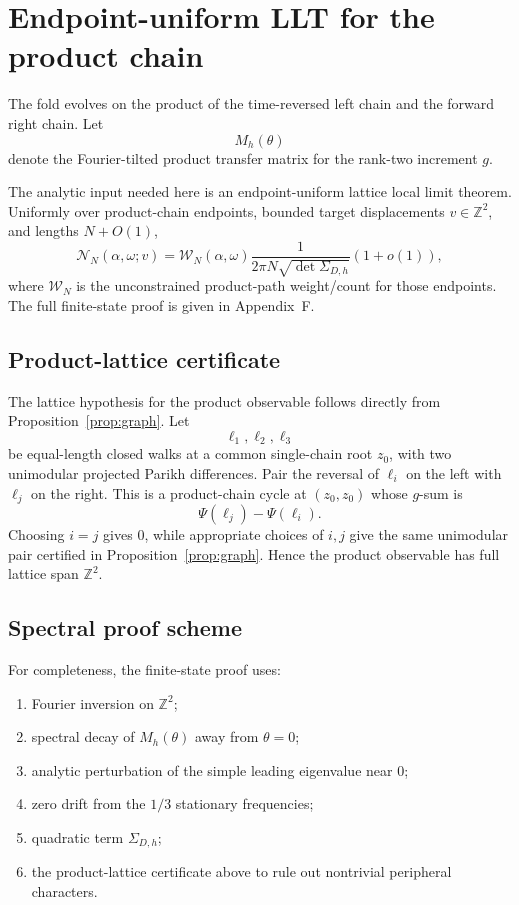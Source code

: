 \documentclass[12pt]{article}
\theoremstyle{definition}
\begin{document}
\section{Endpoint-uniform LLT for the product chain}
\label{sec:llt}

The fold evolves on the product of the time-reversed left chain and the forward right chain. Let
\[
M_h(\theta)
\]
denote the Fourier-tilted product transfer matrix for the rank-two increment \(g\).

The analytic input needed here is an endpoint-uniform lattice local limit theorem. Uniformly over product-chain endpoints, bounded target displacements \(v\in\mathbb Z^2\), and lengths \(N+O(1)\),
\begin{equation}\label{eq:llt}
\mathcal N_N(\alpha,\omega;v)
=
\mathcal W_N(\alpha,\omega)
\frac{1}{2\pi N\sqrt{\det\Sigma_{D,h}}}
(1+o(1)),
\end{equation}
where \(\mathcal W_N\) is the unconstrained product-path weight/count for those endpoints. The full finite-state proof is given in Appendix~F.

\subsection*{Product-lattice certificate}

The lattice hypothesis for the product observable follows directly from Proposition~\ref{prop:graph}. Let
\[
\ell_1,\ell_2,\ell_3
\]
be equal-length closed walks at a common single-chain root \(z_0\), with two unimodular projected Parikh differences. Pair the reversal of \(\ell_i\) on the left with \(\ell_j\) on the right. This is a product-chain cycle at \((z_0,z_0)\) whose \(g\)-sum is
\[
\Psi(\ell_j)-\Psi(\ell_i).
\]
Choosing \(i=j\) gives \(0\), while appropriate choices of \(i,j\) give the same unimodular pair certified in Proposition~\ref{prop:graph}. Hence the product observable has full lattice span \(\mathbb Z^2\).

\subsection*{Spectral proof scheme}

For completeness, the finite-state proof uses:
\begin{enumerate}
\item Fourier inversion on \(\mathbb Z^2\);
\item spectral decay of \(M_h(\theta)\) away from \(\theta=0\);
\item analytic perturbation of the simple leading eigenvalue near \(0\);
\item zero drift from the \(1/3\) stationary frequencies;
\item quadratic term \(\Sigma_{D,h}\);
\item the product-lattice certificate above to rule out nontrivial peripheral characters.
\end{enumerate}
\end{document}
